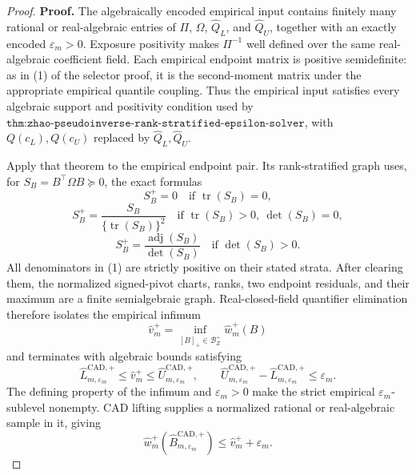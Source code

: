 \documentclass{article}
\begin{document}
\begin{proof}
\textbf{Proof.}
The algebraically encoded empirical input contains finitely many rational or real-algebraic entries of \(\Pi\), \(\Omega\), \(\widehat Q_L\), and \(\widehat Q_U\), together with an exactly encoded \(\varepsilon_m>0\).  Exposure positivity makes \(\Pi^{-1}\) well defined over the same real-algebraic coefficient field.  Each empirical endpoint matrix is positive semidefinite: as in (1) of the selector proof, it is the second-moment matrix under the appropriate empirical quantile coupling.  Thus the empirical input satisfies every algebraic support and positivity condition used by \(\texttt{thm:zhao-pseudoinverse-rank-stratified-epsilon-solver}\), with \(Q(c_L),Q(c_U)\) replaced by \(\widehat Q_L,\widehat Q_U\).

Apply that theorem to the empirical endpoint pair.  Its rank-stratified graph uses, for \(S_B=B^{\top}\Omega B\succeq0\), the exact formulas
\[
S_B^+=0\quad\text{if }\operatorname{tr}(S_B)=0,
\]
\[
S_B^+=\frac{S_B}{\{\operatorname{tr}(S_B)\}^2}
\quad\text{if }\operatorname{tr}(S_B)>0,\ \det(S_B)=0,
\]
\[
S_B^+=\frac{\operatorname{adj}(S_B)}{\det(S_B)}
\quad\text{if }\det(S_B)>0.
\tag{1}
\]
All denominators in (1) are strictly positive on their stated strata.  After clearing them, the normalized signed-pivot charts, ranks, two endpoint residuals, and their maximum are a finite semialgebraic graph.  Real-closed-field quantifier elimination therefore isolates the empirical infimum
\[
\widehat v_m^+=\inf_{[B]_+\in\mathcal B_Z^+}\widehat w_m^+(B)
\]
and terminates with algebraic bounds satisfying
\[
\widehat L_{m,\varepsilon_m}^{\mathrm{CAD},+}
\le\widehat v_m^+
\le\widehat U_{m,\varepsilon_m}^{\mathrm{CAD},+},
\qquad
\widehat U_{m,\varepsilon_m}^{\mathrm{CAD},+}
-\widehat L_{m,\varepsilon_m}^{\mathrm{CAD},+}\le\varepsilon_m.
\tag{2}
\]
The defining property of the infimum and \(\varepsilon_m>0\) make the strict empirical \(\varepsilon_m\)-sublevel nonempty.  CAD lifting supplies a normalized rational or real-algebraic sample in it, giving
\[
\widehat w_m^+(\widehat B_{m,\varepsilon_m}^{\mathrm{CAD},+})
\le\widehat v_m^++\varepsilon_m.
\tag{3}
\]


\end{proof}
\end{document}
